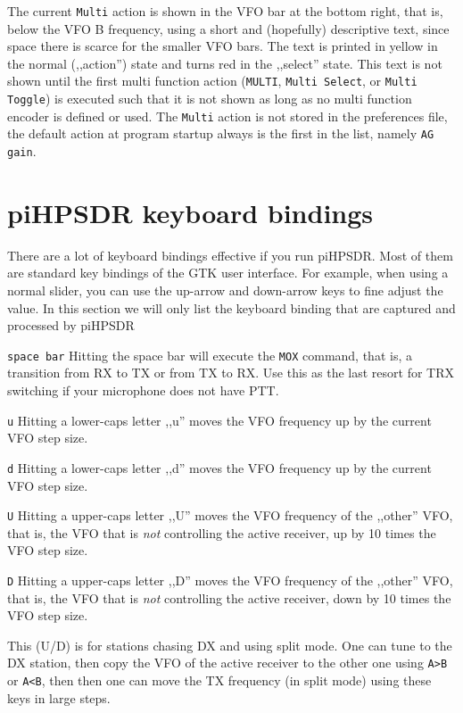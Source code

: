 \documentclass[12pt]{book}
\def\rett#1{\texttt{\color{red}#1}}
\def\bltt#1{\texttt{\color{blue}#1}}
\begin{document}
The current \bltt{Multi} action is shown in the VFO bar at the bottom right, that is, below
the VFO B frequency, using a short and (hopefully) descriptive text, since space there is
scarce for the smaller VFO bars. The text is printed in yellow in the normal (,,action'') state and
turns red in the ,,select'' state. This text is not shown until the first multi function action
(\bltt{MULTI}, \bltt{Multi Select}, or \bltt{Multi Toggle}) is executed such that it is not
shown as long as no multi function encoder is defined or used. The \bltt{Multi} action is not
stored in the preferences file, the default action at program startup always is the first in the list,
namely \bltt{AG gain}.
\chapter{piHPSDR keyboard bindings}

There are a lot of keyboard bindings effective if you run piHPSDR. Most of them are
standard key bindings of the GTK user interface. For example, when using a normal
slider, you can use the up-arrow and down-arrow keys to fine adjust the value. In this
section we will only list the keyboard binding that are captured and processed by piHPSDR

\rett{space bar} Hitting the space bar will execute the \bltt{MOX} command, that is, a
transition from RX to TX or from TX to RX. Use this as the last resort for TRX switching
if your microphone does not have PTT.

\rett{u} Hitting a lower-caps letter ,,u'' moves the VFO frequency up by the current VFO
step size.

\rett{d} Hitting a lower-caps letter ,,d'' moves the VFO frequency up by the current VFO
step size.

\rett{U} Hitting a upper-caps letter ,,U'' moves the VFO frequency of the ,,other'' VFO, that is,
the VFO that is \textit{not} controlling the active receiver, up by 10 times the VFO step size.

\rett{D} Hitting a upper-caps letter ,,D'' moves the VFO frequency of the ,,other'' VFO, that is,
the VFO that is \textit{not} controlling the active receiver, down by 10 times the VFO step size.

This (U/D) is for stations chasing DX and using split mode. One can tune to the DX station,
then copy the VFO of the active receiver to the other one using \bltt{A>B} or \bltt{A<B}, then then
one can  move the TX frequency (in split mode) using these keys in large steps.
\end{document}
